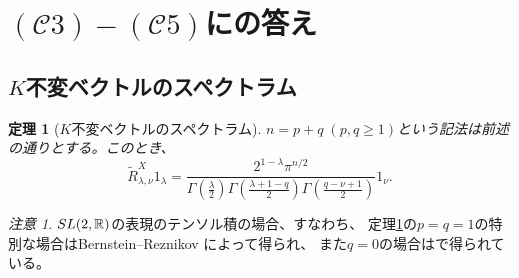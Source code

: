 \documentclass[notheorems]{beamer}
\newcommand{\tmop}[1]{\ensuremath{\operatorname{#1}}}
\newtheorem{theorem}{定理}
\theoremstyle{definition}
\theoremstyle{example}
\theoremstyle{remark}
\newtheorem*{remark}{注意}
\theoremstyle{mystyle}
\begin{document}
\section{$(\mathcal{C}3) - (\mathcal{C}5)$にの答え}
\subsection{$K$不変ベクトルのスペクトラム}
\begin{frame}
	\begin{theorem}[$K$不変ベクトルのスペクトラム]
		\label{thm:spherical}
	$n=p+q\;(p,q\ge1)$という記法は前述の通りとする。この{とき、}
	\begin{equation*}
		\tilde{R}_{\lambda, \nu}^X 1_{\lambda} =
\frac{2^{1 - \lambda} \pi^{n / 2}}{\Gamma \left( \frac{\lambda}{2} \right)
\Gamma \left( \frac{\lambda + 1 - q}{2} \right) \Gamma \left( \frac{q - \nu +
1}{2} \right)} 1_{\nu}.
	\end{equation*}
	\end{theorem}
	\begin{remark}
	$SL(2,\mathbb{R})$の表現のテンソル積の場合、すなわち、
	定理\ref{thm:spherical}\;の$p=q=1$の特別な場合はBernstein--Reznikov\cite[Lem. A.5]{bernstein2004estimates} によって得られ、
	また$q=0$の場合は\cite[Prop.\ 7.4]{kobayashi2015symmetry}で得られている。
	\end{remark}
\end{frame}
\end{document}
